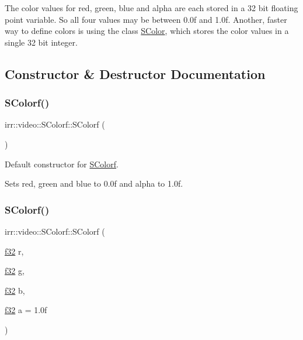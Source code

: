 The color values for red, green, blue and alpha are each stored in a 32 bit floating point variable. So all four values may be between 0.\+0f and 1.\+0f. Another, faster way to define colors is using the class \hyperlink{classirr_1_1video_1_1SColor}{S\+Color}, which stores the color values in a single 32 bit integer. 

\subsection{Constructor \& Destructor Documentation}
\mbox{\label{classirr_1_1video_1_1SColorf_a701ea1b449c2aae4a3dd44a13055ac3e}} 
\subsubsection{\texorpdfstring{S\+Colorf()}{SColorf()}\hspace{0.1cm}{\footnotesize\ttfamily [1/6]}}
{\footnotesize\ttfamily irr\+::video\+::\+S\+Colorf\+::\+S\+Colorf (\begin{DoxyParamCaption}{ }\end{DoxyParamCaption})\hspace{0.3cm}{\ttfamily [inline]}}



Default constructor for \hyperlink{classirr_1_1video_1_1SColorf}{S\+Colorf}. 

Sets red, green and blue to 0.\+0f and alpha to 1.\+0f. \mbox{\label{classirr_1_1video_1_1SColorf_adaf8df839d5174aedba17e61ba28fc64}} 
\subsubsection{\texorpdfstring{S\+Colorf()}{SColorf()}\hspace{0.1cm}{\footnotesize\ttfamily [2/6]}}
{\footnotesize\ttfamily irr\+::video\+::\+S\+Colorf\+::\+S\+Colorf (\begin{DoxyParamCaption}\item[{\hyperlink{namespaceirr_a0277be98d67dc26ff93b1a6a1d086b07}{f32}}]{r,  }\item[{\hyperlink{namespaceirr_a0277be98d67dc26ff93b1a6a1d086b07}{f32}}]{g,  }\item[{\hyperlink{namespaceirr_a0277be98d67dc26ff93b1a6a1d086b07}{f32}}]{b,  }\item[{\hyperlink{namespaceirr_a0277be98d67dc26ff93b1a6a1d086b07}{f32}}]{a = {\ttfamily 1.0f} }\end{DoxyParamCaption})\hspace{0.3cm}{\ttfamily [inline]}}



